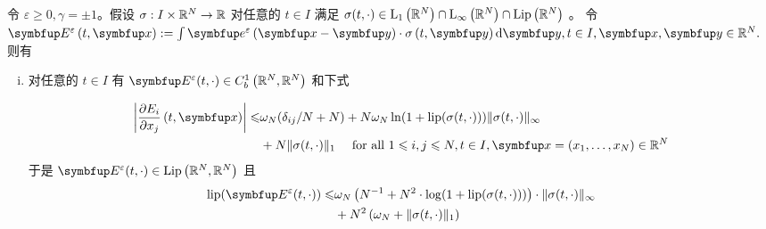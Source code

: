 \begin{lemma}
    \label{lem:lip-E}
    令 $\varepsilon \geqslant 0, \gamma=\pm 1$。假设 $\sigma: I \times {\mathbb{R}}^{N} \rightarrow {\mathbb{R}}$ 对任意的 $t \in I$ 满足 $\sigma(t, \cdot) \in \mathrm{L}_{1}\left({\mathbb{R}}^{N}\right) \cap \mathrm{L}_{\infty}\left({\mathbb{R}}^{N}\right) \cap \operatorname{Lip}\left({\mathbb{R}}^{N}\right)$ 。 令  $\vE^\varepsilon\left(t, \vx\right):=\int \vect{e}^{\varepsilon}\left(\vx-\vect{y}\right) \cdot \sigma\left(t, \vect{y}\right) \mathrm{d} \vect{y}, t \in I, \vx,\vect{y} \in \bbR^{N} .$ 则有
\begin{enumerate}[(i)]
    \item 对任意的 $t \in I$ 有 $\vE^\varepsilon(t, \cdot) \in C_{b}^{1}\left(\bbR^{N}, \bbR^{N}\right)$ 和下式

    \[
    \begin{aligned}
        \left|\frac{\partial E_{i}}{\partial x_{j}}\left(t, \vx\right)\right| \leqslant &\omega_{N} ( \delta_{i j}/N+N) + N \omega_N \ln (1+\operatorname{lip}(\sigma(t, \cdot))) \|\sigma(t, \cdot)\|_{\infty} \\
          &+ N\|\sigma(t, \cdot)\|_{1} 
    \quad \text { for all } 1 \leqslant i, j \leqslant N, t \in I, \vx=\left(x_{1}, \ldots, x_{N}\right) \in \bbR^{N}
    \end{aligned}
    \]
    于是 $\vE^\varepsilon(t, \cdot) \in \operatorname{Lip}\left(\bbR^{N}, \bbR^{N}\right)$ 且
    \[
    \begin{aligned}
    \operatorname{lip}(\vE^\varepsilon(t, \cdot)) \leqslant & \omega_{N}\left(N^{-1}+N^{2} \cdot \log (1+\operatorname{lip}(\sigma(t, \cdot)))\right) \cdot\|\sigma(t, \cdot)\|_{\infty} \\
    &+N^{2}\left(\omega_{N}+\|\sigma(t, \cdot)\|_{1}\right)
    \end{aligned}
    \]
    
    
\end{enumerate}

\end{lemma}

